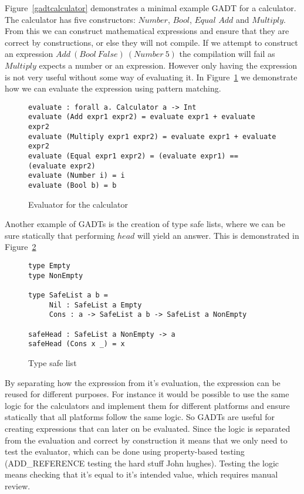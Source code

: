 Figure~\ref{gadtcalculator} demonstrates a minimal example GADT for a
calculator. The calculator has five constructors: $Number$, $Bool$, $Equal$
$Add$ and $Multiply$. From this we can construct mathematical expressions and
ensure that they are correct by constructions, or else they will not compile.
If we attempt to construct an expression $Add\ (Bool\ False)\ (Number\ 5)$ the
compilation will fail as $Multiply$ expects a number or an expression. However
only having the expression is not very useful without some way of evaluating it.
In Figure~\ref{calculator} we demonstrate how we can evaluate the expression
using pattern matching.

\begin{figure}[H]
    \begin{lstlisting}
evaluate : forall a. Calculator a -> Int
evaluate (Add expr1 expr2) = evaluate expr1 + evaluate expr2
evaluate (Multiply expr1 expr2) = evaluate expr1 + evaluate expr2
evaluate (Equal expr1 expr2) = (evaluate expr1) == (evaluate expr2)
evaluate (Number i) = i
evaluate (Bool b) = b
    \end{lstlisting}
    \caption{Evaluator for the calculator}
    \label{calculator}
\end{figure}

Another example of GADTs is the creation of type safe lists, where we can be
sure statically that performing $head$ will yield an answer. This is
demonstrated in Figure~\ref{safelist}

\begin{figure}[H]
    \begin{lstlisting}
type Empty
type NonEmpty

type SafeList a b =
     Nil : SafeList a Empty
     Cons : a -> SafeList a b -> SafeList a NonEmpty

safeHead : SafeList a NonEmpty -> a
safeHead (Cons x _) = x
    \end{lstlisting}
    \caption{Type safe list}
    \label{safelist}
\end{figure}

By separating how the expression from it's evaluation, the expression can be
reused for different purposes. For instance it would be possible to use the same
logic for the calculators and implement them for different platforms and ensure
statically that all platforms follow the same logic. So GADTs are useful for
creating expressions that can later on be evaluated.  Since the logic is
separated from the evaluation and correct by construction it means that we only
need to test the evaluator, which can be done using property-based testing
(ADD\_REFERENCE testing the hard stuff John hughes). Testing the logic means
checking that it's equal to it's intended value, which requires manual review.


